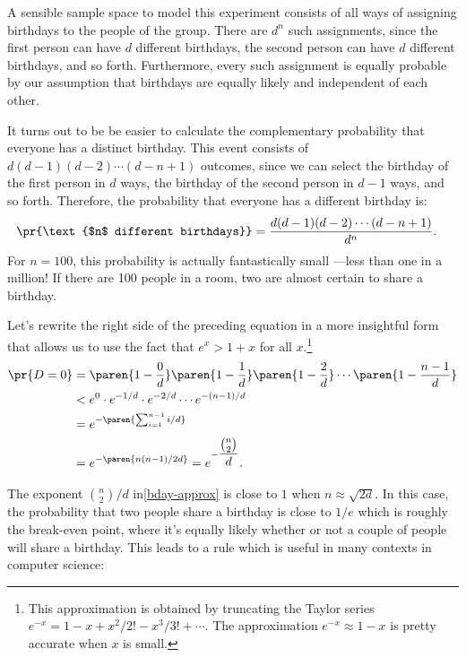 A sensible sample space to model this experiment consists of all ways of
assigning birthdays to the people of the group.  There are $d^n$ such
assignments, since the first person can have $d$ different birthdays, the
second person can have $d$ different birthdays, and so forth.
Furthermore, every such assignment is equally probable by our assumption
that birthdays are equally likely and independent of each other.

It turns out to be be easier to calculate the complementary probability
that everyone has a distinct birthday.  This event consists of $d (d - 1)
(d - 2) \cdots (d - n + 1)$ outcomes, since we can select the birthday of
the first person in $d$ ways, the birthday of the second person in $d - 1$
ways, and so forth.  Therefore, the probability that everyone has a
different birthday is:
\begin{align*}
\pr{\text{$n$ different birthdays}} & = \frac{d (d - 1) (d - 2) \cdots (d - n + 1)}{d^n}.
\end{align*}
For $n=100$, this probability is actually fantastically small ---less
than one in a million!  If there are 100 people in a room, two are
almost certain to share a birthday.

Let's rewrite the right side of the preceding equation in a more
insightful form that allows us to use the fact that $e^x >1+x$ for all
$x$.\footnote{This approximation is obtained by truncating the Taylor
series $e^{-x} = 1 - x + x^2/2! - x^3/3! + \cdots$.  The approximation
$e^{-x} \approx 1 - x$ is pretty accurate when $x$ is small.}
\begin{align}
\pr{D=0} & = \paren{1 - \frac{0}{d}}
             \paren{1 - \frac{1}{d}}
             \paren{1 - \frac{2}{d}}
             \cdots
             \paren{1 - \frac{n - 1}{d}}\notag\\
       & < e^0 \cdot e^{-1/d} \cdot e^{-2/d} \cdots e^{-(n-1)/d} \notag\\
       & = e^{-\paren{\sum_{i=1}^{n-1} i/d}}\notag\\
       & = e^{-\paren{n(n-1)/2d}} = e^{-\dfrac{\binom{n}{2}}{d}}.\label{bday-approx}
\end{align}

The exponent $\binom{n}{2}/d$ in\eqref{bday-approx} is close to $1$ when
$n \approx \sqrt{2d}$.  In this case, the probability that two people
share a birthday is close to $1/e$ which is roughly the break-even point,
where it's equally likely whether or not a couple of people will share a
birthday.  This leads to a rule which is useful in many contexts in
computer science:

